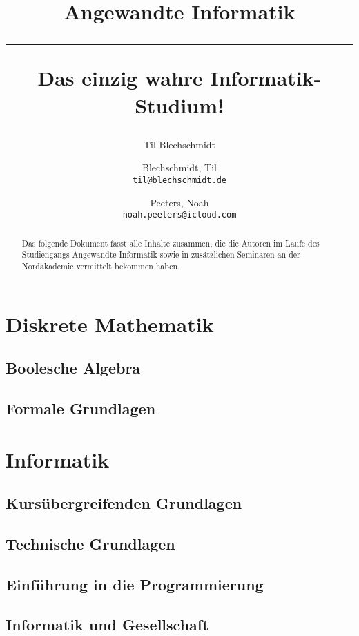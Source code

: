 \documentclass[a4paper]{report}
\title{Angewandte Informatik \\
    \noindent\rule[0.25ex]{\linewidth}{0.5pt}
    \large Das einzig wahre Informatik-Studium!
}
\author{Til Blechschmidt}
\author{
  Blechschmidt, Til\\
  \texttt{til@blechschmidt.de}
  \and
  Peeters, Noah\\
  \texttt{noah.peeters@icloud.com}
}
\begin{document}
	\thispagestyle{fancy}
	\maketitle

 	\begin{abstract}
         Das folgende Dokument fasst alle Inhalte zusammen, die die Autoren im Laufe des Studiengangs Angewandte Informatik sowie in zusätzlichen Seminaren an der Nordakademie vermittelt bekommen haben.
 	\end{abstract}
 	\newpage

	\tableofcontents

	\part{Diskrete Mathematik}
	    \chapter{Boolesche Algebra}
	        
	    \chapter{Formale Grundlagen}
	        

    \part{Informatik}
        \chapter{Kursübergreifenden Grundlagen}
            
        \chapter{Technische Grundlagen}
            
        \chapter{Einführung in die Programmierung}
            
        \chapter{Informatik und Gesellschaft}
            
\end{document}
